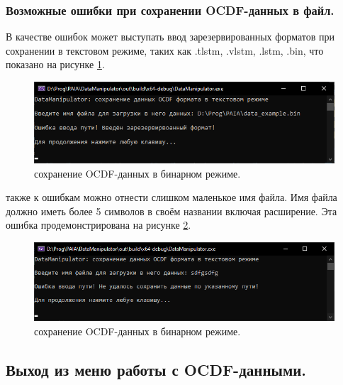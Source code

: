 \subsubsection{ \standartTitleFont
  Возможные ошибки при сохранении OCDF-данных в файл.
} \label{subsubsec:OCDFSageErr}

{\standartFont

  \par В качестве ошибок может выступать ввод зарезервированных форматов при сохранении в текстовом режиме, таких как .tlstm, .vlstm, .lstm, .bin, что показано на рисунке \ref{fig:OCDFsafeERes}.

  \begin{figure}[H]
    \centering
    \includegraphics[width=\textwidth]{images/forDataManipulator/OCDFsafeCSVErrReser.png}
    \caption{сохранение OCDF-данных в бинарном режиме.}
    \label{fig:OCDFsafeERes}
  \end{figure}

  \par также к ошибкам можно отнести слишком маленькое имя файла. Имя файла должно иметь более 5 символов в своём названии включая расширение. Эта ошибка продемонстрирована на рисунке \ref{fig:OCDFsafeEInv}.

  \begin{figure}[H]
    \centering
    \includegraphics[width=\textwidth]{images/forDataManipulator/OCDFsafeCSVErrInvalid.png}
    \caption{сохранение OCDF-данных в бинарном режиме.}
    \label{fig:OCDFsafeEInv}
  \end{figure}
}

\subsection{ \standartTitleFont
  Выход из меню работы с OCDF-данными.
} \label{subsec:OCDFOut}

